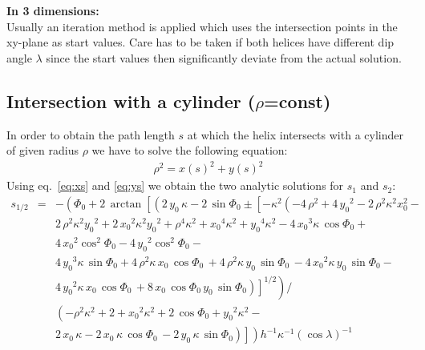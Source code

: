 \documentclass[twoside]{article}
\begin{document}
{\bf In 3 dimensions:}\\
Usually an iteration method is applied which uses the intersection
points in the xy-plane as start values. Care has to be taken if both
helices have different dip angle $\lambda$ since the start values then
significantly deviate from the actual solution.

\subsection{Intersection with a cylinder ($\rho$=const)}

In order to obtain the path length $s$ at which the helix
intersects with a cylinder of given radius $\rho$ we have to solve
the following equation:
\begin{eqnarray}
    \rho^2 = x(s)^2 + y(s)^2
\end{eqnarray}
Using eq.~\ref{eq:xs} and \ref{eq:ys} we obtain the two analytic solutions for $s_1$ and $s_2$:
\begin{eqnarray} \label{eq:rsolve}
    s_{1/2} &=& -\left({\Phi_0}+2\,\arctan \left[
            \left(2\,{y_0}\,\kappa-2\,\sin{\Phi_0} \pm \left[ -
                    \kappa^2\left (-4\,\rho^2+4\,{y_0}^2 - 2\,\rho^2\kappa^2 x_0^2 -  
                    \right. \right. \right. \right. \right. \\ \nonumber
    & & \left. \left. \left. \left. \left.
                        2\,\rho^2 \kappa^2 {y_0}^{2} + 2\,{{x_0}}^{2}{\kappa}^{2}{
                            {y_0}}^{2}+{\rho}^{4}{\kappa}^{2}+{{x_0}}^{4}{\kappa}^{2}+{{y_0}}^{4}{
                            \kappa}^{2}-4\,{{x_0}}^{3}\kappa\,\cos{\Phi_0} +
                    \right. \right. \right. \right. \right. \\ \nonumber
    & & \left. \left. \left. \left. \left.
                        4\,{{x_0}}^{2}\cos^2{\Phi_0} - 4\,{{y_0}}^{2} \cos^{2}{\Phi_0} -
                    \right. \right. \right. \right. \right. \\ \nonumber
    & & \left. \left. \left. \left. \left.
                        4\,{{y_0}}
                        ^{3}\kappa\,\sin{\Phi_0}+4\,{\rho}^{2}\kappa\,{x_0}\,\cos{\Phi_0}\, + 4\,{\rho}^{2}\kappa
                        \,{y_0}\,\sin{\Phi_0}\, -4\,{{x_0}}^{2}\kappa\,{y_0}\,\sin{\Phi_0} -
                    \right. \right. \right. \right. \right. \\ \nonumber
    & & \left. \left. \left. \left. \left.
                        4\,{{y_0}}^{2}\kappa\,{x_0}\,\cos{\Phi_0}\, +8\,{x_0}\,\cos{\Phi_0}\,{y_0}\,\sin{\Phi_0}
                    \right ) \right]^{1/2} \right) /
        \right. \right. \\ \nonumber
    & & \left. \left.
            \left(
                -{\rho}^{2}{\kappa}^{2}+2+{x_0}^{2}{\kappa}^{2}+2\,\cos{\Phi_0}+{y_0}^{2}{\kappa}^{2} -
            \right. \right. \right. \\ \nonumber
    & & \left. \left. \left.
                2\,{x_0}\,\kappa-2\,{x_0}\,\kappa\,\cos{\Phi_0}\,
                -2\,{y_0}\,\kappa\,\sin{\Phi_0} \right)
        \right] \right){h}^{-1}{\kappa}^{-1}\left (
        \cos\lambda\right )^{-1}
\end{eqnarray}
\end{document}

